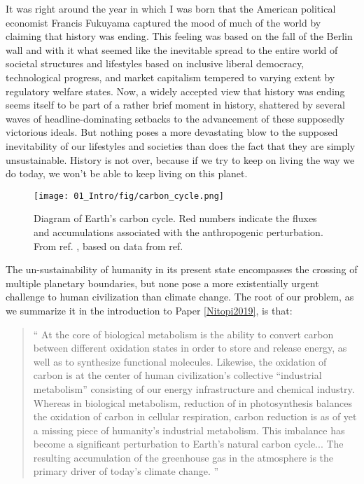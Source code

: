 It was right around the year in which I was born that the American political economist Francis Fukuyama captured the mood of much of the world by claiming that history was ending\cite{Fukuyama1992}. This feeling was based on the fall of the Berlin wall and with it what seemed like the inevitable spread to the entire world of societal structures and lifestyles based on inclusive liberal democracy, technological progress, and market capitalism tempered to varying extent by regulatory welfare states. Now, a widely accepted view that history was ending seems itself to be part of a rather brief moment in history, shattered 
by several waves of headline-dominating setbacks to the advancement of these supposedly victorious ideals.
But nothing poses a more devastating blow to the supposed inevitability of our lifestyles and societies than does the fact that they are simply unsustainable. History is not over, because if we try to keep on living the way we do today, we won't be able to keep living on this planet.

\begin{figure}[h!]
	\centering
	\texttt{[image: 01\_Intro/fig/carbon\_cycle.png]}
	\caption{Diagram of Earth's carbon cycle. Red numbers indicate the fluxes and accumulations associated with the anthropogenic perturbation. From ref. , based on data from ref. }
	\label{fig:carbon_cycle}
\end{figure}

The un-sustainability of humanity in its present state encompasses the crossing of multiple planetary boundaries\cite{Rockstrom2009}, but none pose a more existentially urgent challenge to human civilization than climate change. The root of our problem, as we summarize it in the introduction to Paper \ref{Nitopi2019}, is that:

\begin{quotation}
		{\Large``} At the core of biological metabolism is the ability to convert carbon between different oxidation states in order to store and release energy, as well as to synthesize functional molecules. Likewise, the oxidation of carbon is at the center of human civilization's collective “industrial metabolism” consisting of our energy infrastructure and chemical industry. Whereas in biological metabolism, reduction of  in photosynthesis balances the oxidation of carbon in cellular respiration, carbon reduction is as of yet a missing piece of humanity's industrial metabolism. This imbalance has become a significant perturbation to Earth’s natural carbon cycle... The resulting accumulation of the greenhouse gas  in the atmosphere is the primary	driver of today’s climate change\cite{IPCC2014}. {\Large''}
\end{quotation}

